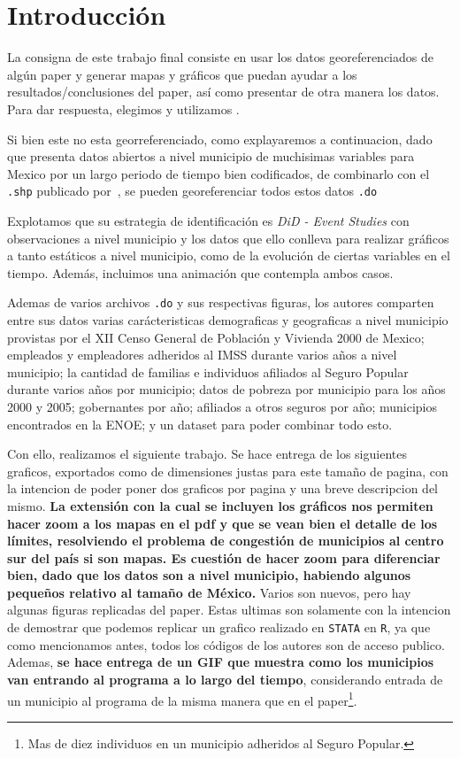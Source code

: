 \documentclass[9pt]{article}
\begin{document}
\section*{Introducci\'on}
La consigna de este trabajo final consiste en usar los datos georeferenciados de algún paper y generar mapas y gráficos que puedan ayudar a los resultados/conclusiones del paper, as\'i como presentar de otra manera los datos. Para dar respuesta, elegimos y utilizamos \cite{10.1257/pol.6.4.71}. 

Si bien este no est\’a georreferenciado, como explayaremos a continuaci\’on, dado que presenta datos abiertos a nivel municipio de much\’isimas variables para M\’exico por un largo per\’iodo de tiempo bien codificados, de combinarlo con el \texttt{.shp} publicado por~\cite{shapefile}, se pueden georeferenciar todos estos datos \texttt{.do}

Explotamos que su estrategia de identificaci\'on es \textit{DiD - Event Studies} con observaciones a nivel municipio y los datos que ello conlleva para realizar gr\'aficos a tanto est\'aticos a nivel municipio, como de la evoluci\'on de ciertas variables en el tiempo. Adem\'as, incluimos una animaci\'on que contempla ambos casos.

Adem\’as de varios archivos \texttt{.do} y sus respectivas figuras, los autores comparten entre sus datos varias carácter\’isticas demogr\’aficas y geogr\’aficas a nivel municipio provistas por el XII Censo General de Población y Vivienda 2000 de M\’exico; empleados y empleadores adheridos al IMSS durante varios a\~nos a nivel municipio;  la cantidad de familias e individuos afiliados al Seguro Popular durante varios a\~nos por municipio; datos de pobreza por municipio para los a\~nos 2000 y 2005; gobernantes por a\~no; afiliados a otros seguros por a\~no; municipios encontrados en la ENOE; y un dataset para poder combinar todo esto.

Con ello, realizamos el siguiente trabajo. Se hace entrega de los siguientes gr\’aficos, exportados como  de dimensiones justas para este tama\~no de p\’agina, con la intenci\’on de poder poner dos gr\’aficos por p\’agina y una breve descripci\’on del mismo.\textbf{ La extensi\'on con la cual se incluyen los gr\'aficos nos permiten hacer zoom a los mapas en el pdf y que se vean bien el detalle de los l\'imites, resolviendo el problema de congesti\'on de municipios al centro sur del pa\'is si son mapas. Es cuesti\'on de hacer zoom para diferenciar bien, dado que los datos son a nivel municipio, habiendo algunos peque\~nos relativo al tama\~no de M\'exico.} Varios son nuevos, pero hay algunas figuras replicadas del paper. Estas \’ultimas son solamente con la intenci\’on de demostrar que podemos replicar un gr\’afico realizado en \texttt{STATA} en \texttt{R}, ya que como mencionamos antes, todos los códigos de los autores son de acceso p\’ublico. Adem\’as, \textbf{se hace entrega de un GIF que muestra como los municipios van entrando al programa a lo largo del tiempo}, considerando entrada de un municipio al programa de la misma manera que en el paper\footnote{M\’as de diez individuos en un municipio adheridos al Seguro Popular.}. 
\end{document}
